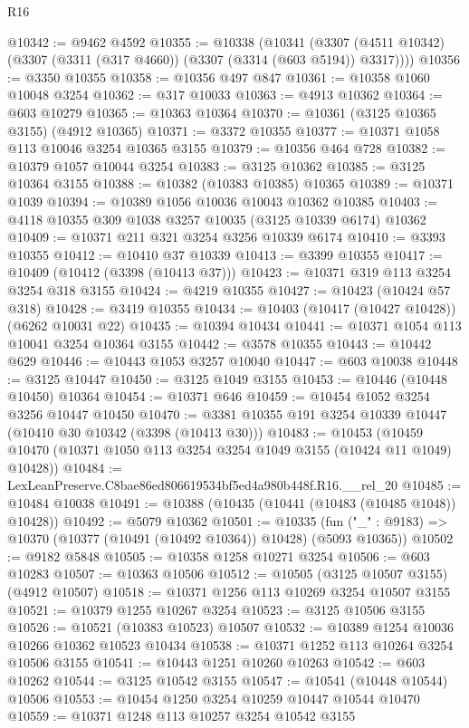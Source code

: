\begin{lexlean}{R16}
\begin{coremodule}
@10342 := @9462 @4592
@10355 := @10338
    (@10341 (@3307 (@4511 @10342) (@3307 (@3311 (@317 @4660)) (@3307 (@3314 (@603 @5194)) @3317))))
@10356 := @3350 @10355
@10358 := @10356 @497 @847
@10361 := @10358 @1060 @10048 @3254
@10362 := @317 @10033
@10363 := @4913 @10362
@10364 := @603 @10279
@10365 := @10363 @10364
@10370 := @10361 (@3125 @10365 @3155) (@4912 @10365)
@10371 := @3372 @10355
@10377 := @10371 @1058 @113 @10046 @3254 @10365 @3155
@10379 := @10356 @464 @728
@10382 := @10379 @1057 @10044 @3254
@10383 := @3125 @10362
@10385 := @3125 @10364 @3155
@10388 := @10382 (@10383 @10385) @10365
@10389 := @10371 @1039
@10394 := @10389 @1056 @10036 @10043 @10362 @10385
@10403 := @4118 @10355 @309 @1038 @3257 @10035 (@3125 @10339 @6174) @10362
@10409 := @10371 @211 @321 @3254 @3256 @10339 @6174
@10410 := @3393 @10355
@10412 := @10410 @37 @10339
@10413 := @3399 @10355
@10417 := @10409 (@10412 (@3398 (@10413 @37)))
@10423 := @10371 @319 @113 @3254 @3254 @318 @3155
@10424 := @4219 @10355
@10427 := @10423 (@10424 @57 @318)
@10428 := @3419 @10355
@10434 := @10403 (@10417 (@10427 @10428)) (@6262 @10031 @22)
@10435 := @10394 @10434
@10441 := @10371 @1054 @113 @10041 @3254 @10364 @3155
@10442 := @3578 @10355
@10443 := @10442 @629
@10446 := @10443 @1053 @3257 @10040
@10447 := @603 @10038
@10448 := @3125 @10447
@10450 := @3125 @1049 @3155
@10453 := @10446 (@10448 @10450) @10364
@10454 := @10371 @646
@10459 := @10454 @1052 @3254 @3256 @10447 @10450
@10470 := @3381 @10355 @191 @3254 @10339 @10447 (@10410 @30 @10342 (@3398 (@10413 @30)))
@10483 := @10453
    (@10459 @10470 (@10371 @1050 @113 @3254 @3254 @1049 @3155 (@10424 @11 @1049) @10428))
@10484 := LexLeanPreserve.C8bae86ed806619534bf5ed4a980b448f.R16.__rel_20
@10485 := @10484 @10038
@10491 := @10388 (@10435 (@10441 (@10483 (@10485 @1048)) @10428))
@10492 := @5079 @10362
@10501 := @10335
    (fun ("_" : @9183) => @10370 (@10377 (@10491 (@10492 @10364)) @10428) (@5093 @10365))
@10502 := @9182 @5848
@10505 := @10358 @1258 @10271 @3254
@10506 := @603 @10283
@10507 := @10363 @10506
@10512 := @10505 (@3125 @10507 @3155) (@4912 @10507)
@10518 := @10371 @1256 @113 @10269 @3254 @10507 @3155
@10521 := @10379 @1255 @10267 @3254
@10523 := @3125 @10506 @3155
@10526 := @10521 (@10383 @10523) @10507
@10532 := @10389 @1254 @10036 @10266 @10362 @10523 @10434
@10538 := @10371 @1252 @113 @10264 @3254 @10506 @3155
@10541 := @10443 @1251 @10260 @10263
@10542 := @603 @10262
@10544 := @3125 @10542 @3155
@10547 := @10541 (@10448 @10544) @10506
@10553 := @10454 @1250 @3254 @10259 @10447 @10544 @10470
@10559 := @10371 @1248 @113 @10257 @3254 @10542 @3155

\end{coremodule}
\end{lexlean}
